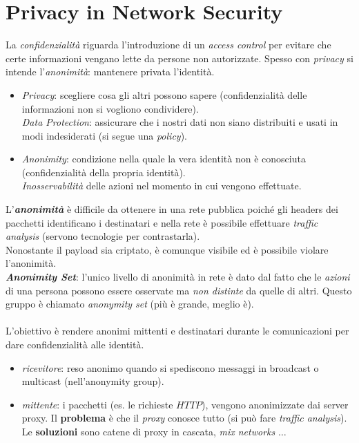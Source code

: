 \documentclass[11pt, a4paper, twoside, italian]{report}
\theoremstyle{plain}
\begin{document}
\section*{Privacy in Network Security}
La \textit{confidenzialità} riguarda l'introduzione di un \textit{access control} per evitare che certe informazioni vengano lette da persone non autorizzate. Spesso con \textit{privacy} si intende l'\textit{anonimità}: mantenere privata l'identità.
\begin{itemize}
	\item \textit{Privacy}: scegliere cosa gli altri possono sapere (confidenzialità delle informazioni non si vogliono condividere).\\
	\textit{Data Protection}: assicurare che i nostri dati non siano distribuiti e usati in modi indesiderati (si segue una \textit{policy}).
	\item \textit{Anonimity}: condizione nella quale la vera identità non è conosciuta (confidenzialità della propria identità).\\
	\textit{Inosservabilità} delle azioni nel momento in cui vengono effettuate.
\end{itemize}
\noindent
L'\textit{\textbf{anonimità}} è difficile da ottenere in una rete pubblica poiché gli headers dei pacchetti identificano i destinatari e nella rete è possibile effettuare \textit{traffic analysis} (servono tecnologie per contrastarla).\\
Nonostante il payload sia criptato, è comunque visibile ed è possibile violare l'anonimità.
\\
\textit{\textbf{Anonimity Set}}: l'unico livello di anonimità in rete è dato dal fatto che le \textit{azioni} di una persona possono essere osservate ma \textit{non distinte} da quelle di altri. Questo gruppo è chiamato \textit{anonymity set} (più è grande, meglio è).\\
\\
L'obiettivo è rendere anonimi mittenti e destinatari durante le comunicazioni per dare confidenzialità alle identità.
\begin{itemize}
	\item \textit{ricevitore}: reso anonimo quando si spediscono messaggi in broadcast o multicast (nell'anonymity group).
	\item \textit{mittente}: i pacchetti (es. le richieste $HTTP$), vengono anonimizzate dai server proxy. Il \textbf{problema} è che il \textit{proxy} conosce tutto (si può fare \textit{traffic analysis}). Le \textbf{soluzioni} sono catene di proxy in cascata, \textit{mix networks} $\dots$
\end{itemize}
\end{document}
